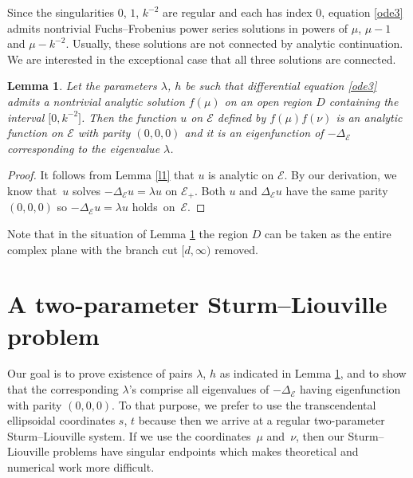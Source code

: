 \documentclass[pdftex]{sigma}
\newtheorem{Lemma}[thm]{Lemma}
\newcommand{\E}{\mathcal{E}}
\newcommand{\D}{\Delta_\E}
\numberwithin{equation}{section}
\begin{document}
Since the singularities $0$, $1$, $k^{-2}$ are regular and each has index $0$, equation \eqref{ode3}
admits nontrivial Fuchs--Frobenius power series solutions in powers of $\mu$, $\mu-1$ and $\mu-k^{-2}$.
Usually, these solutions are not connected by analytic continuation.
We are interested in the exceptional case that all three solutions are connected.

\begin{Lemma}\label{l2}
Let the parameters $\lambda$, $h$ be such that differential equation \eqref{ode3}
admits a nontrivial analytic solution $f(\mu)$ on an open region $D$ containing the interval $\bigl[0,k^{-2}\bigr]$.
Then the function $u$ on $\E$ defined by $f(\mu)f(\nu)$ is an analytic function on $\E$ with parity $(0,0,0)$ and it is an eigenfunction of $-\D$
corresponding to the eigenvalue $\lambda$.
\end{Lemma}
\begin{proof}
It follows from Lemma \ref{l1} that $u$ is analytic on $\E$.
By our derivation, we know that~$u$ solves $-\D u=\lambda u$ on $\E_+$.
Both $u$ and $\D u$ have the same parity $(0,0,0)$ so $-\D u=\lambda u$ holds~on~$\E$.
\end{proof}

Note that in the situation of Lemma \ref{l2} the region $D$ can be taken as the entire complex plane with the branch cut $[d,\infty)$ removed.

\section{A two-parameter Sturm--Liouville problem}\label{twopara}

Our goal is to prove existence of pairs $\lambda$, $h$ as indicated in Lemma \ref{l2}, and to show
that the corresponding $\lambda$'s comprise all eigenvalues of $-\D$ having eigenfunction with parity $(0,0,0)$.
To that purpose, we prefer to use the transcendental ellipsoidal coordinates $s$, $t$ because then we arrive at
a regular two-parameter Sturm--Liouville system.
If we use the coordinates~$\mu$ and~$\nu$, then our Sturm--Liouville problems have singular endpoints which
makes theoretical and numerical work more difficult.
\end{document}
